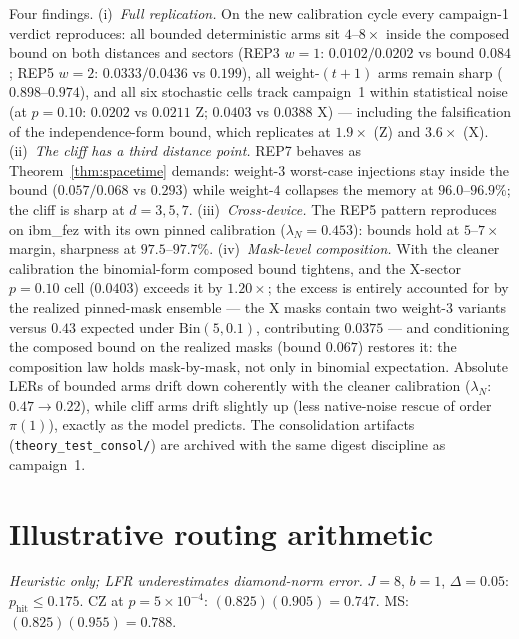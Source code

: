 \documentclass[11pt,a4paper]{article}
\begin{document}
Four findings. (i)~\emph{Full replication.} On the new calibration cycle
every campaign-1 verdict reproduces: all bounded deterministic arms sit
$4$--$8\times$ inside the composed bound on both distances and sectors
(REP3 $w{=}1$: $0.0102/0.0202$ vs bound $0.084$; REP5 $w{=}2$:
$0.0333/0.0436$ vs $0.199$), all weight-$(t{+}1)$ arms remain sharp
($0.898$--$0.974$), and all six stochastic cells track campaign~1 within
statistical noise (at $p{=}0.10$: $0.0202$ vs $0.0211$ Z; $0.0403$ vs
$0.0388$ X) --- including the falsification of the independence-form
bound, which replicates at $1.9\times$ (Z) and $3.6\times$ (X).
(ii)~\emph{The cliff has a third distance point.} REP7 behaves as
Theorem~\ref{thm:spacetime} demands: weight-$3$ worst-case injections
stay inside the bound ($0.057/0.068$ vs $0.293$) while weight-$4$
collapses the memory at $96.0$--$96.9\%$; the cliff is sharp at
$d{=}3,5,7$. (iii)~\emph{Cross-device.} The REP5 pattern reproduces on
ibm\_fez with its own pinned calibration ($\lambda_N{=}0.453$): bounds
hold at $5$--$7\times$ margin, sharpness at $97.5$--$97.7\%$.
(iv)~\emph{Mask-level composition.} With the cleaner calibration the
binomial-form composed bound tightens, and the X-sector $p{=}0.10$ cell
($0.0403$) exceeds it by $1.20\times$; the excess is entirely accounted
for by the realized pinned-mask ensemble --- the X masks contain two
weight-3 variants versus $0.43$ expected under $\mathrm{Bin}(5,0.1)$,
contributing $0.0375$ --- and conditioning the composed bound on the
realized masks (bound $0.067$) restores it: the composition law holds
mask-by-mask, not only in binomial expectation. Absolute LERs of bounded
arms drift down coherently with the cleaner calibration
($\lambda_N$: $0.47{\to}0.22$), while cliff arms drift slightly up (less
native-noise rescue of order $\pi(1)$), exactly as the model predicts.
The consolidation artifacts (\texttt{theory\_test\_consol/}) are archived
with the same digest discipline as campaign~1.

\section{Illustrative routing arithmetic}\label{app:routing}
\emph{Heuristic only; LFR underestimates diamond-norm error.}
$J=8$, $b=1$, $\Delta=0.05$: $p_\mathrm{hit}\le0.175$.
CZ at $p=5\times10^{-4}$: $(0.825)(0.905)=0.747$.
MS: $(0.825)(0.955)=0.788$.



\end{document}
